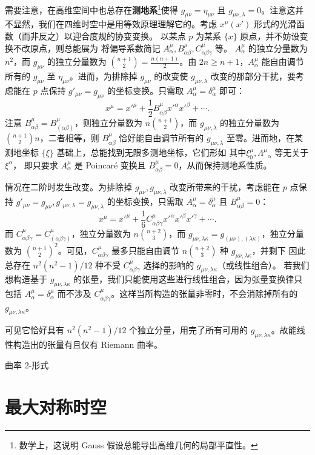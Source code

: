 需要注意，在高维空间中也总存在\textbf{测地系}\footnote{数学上，这说明 Gauss 假设总能导出高维几何的局部平直性。}使得 $g_{\mu\nu}=\eta_{\mu\nu}$ 且 $g_{\mu\nu,\lambda}=0$。注意这并不显然，我们在四维时空中是用等效原理理解它的。考虑 $x^\mu(x')$ 形式的光滑函数（而非反之）以迎合度规的协变变换。
以某点 $p$ 为某系 $\{x\}$ 原点，并不妨设变换不改原点，则总能展为
将偏导系数简记 $A^\mu_\alpha,B^\mu_{\alpha\beta},C^\mu_{\alpha\beta\gamma}$ 等。
$A^\mu_\alpha$ 的独立分量数为 $n^2$，而 $g_{\mu\nu}$ 的独立分量数为 $\binom {n+1}{2}=\frac{n(n+1)}{2}$。由 $2n\geqslant n+1$，$A^\mu_\alpha$ 能自由调节所有的 $g_{\mu\nu}$ 至 $\eta_{\mu\nu}$。进而，为排除掉 $g_{\mu\nu}$ 的改变使 $g_{\mu\nu,\lambda}$ 改变的那部分干扰，要考虑能在 $p$ 点保持 $g'_{\mu\nu}= g_{\mu\nu}$ 的坐标变换。只需取 $A^\mu_\alpha=\delta^\mu_\alpha$ 即可：
\[x^\mu=x'^\mu+\frac 12 B^\mu_{\alpha\beta} x'^\alpha x'^\beta +\cdots.\]
注意 $B^\mu_{\alpha\beta}=B^\mu_{(\alpha\beta)}$，则独立分量数为 $n\binom {n+1}{2}$，而 $g_{\mu\nu,\lambda}$ 的独立分量数为 $\binom {n+1}{2}n$，二者相等，则 $B^\mu_{\alpha\beta}$ 恰好能自由调节所有的 $g_{\mu\nu,\lambda}$ 至零。进而地，在某测地坐标 $\{\xi\}$ 基础上，总能找到无限多测地坐标，它们形如
其中$\xi^\mu_0,\Lambda^\mu{}_\alpha$ 等无关于 $\xi^\alpha$，
即只要求 $A^\mu_\alpha$ 是 Poincaré 变换且 $B^\mu_{\alpha\beta}=0$，从而保持测地系性质。

情况在二阶时发生改变。为排除掉 $g_{\mu\nu},g_{\mu\nu,\lambda}$ 改变所带来的干扰，考虑能在 $p$ 点保持 $g'_{\mu\nu}= g_{\mu\nu}, g'_{\mu\nu,\lambda}=g_{\mu\nu,\lambda}$ 的坐标变换，只需取 $A^\mu_\alpha=\delta^\mu_\alpha$ 且 $B^\mu_{\alpha\beta}=0$：
\[x^\mu=x'^\mu + \frac 16 C^\mu_{\alpha\beta\gamma} x'^\alpha x'^\beta x'^\gamma+\cdots.\]
而 $C^\mu_{\alpha\beta\gamma}=C^\mu_{(\alpha\beta\gamma)}$，独立分量数为 $n\binom {n+2}{3}$，而 $g_{\mu\nu,\lambda\kappa}=g_{(\mu\nu),(\lambda\kappa)}$，独立分量数为 ${\binom {n+1}{2}}^2$。可见，$C^\mu_{\alpha\beta\gamma}$ 最多只能自由调节 $n\binom {n+2}{3}$ 种 $g_{\mu\nu,\lambda\kappa}$，并剩下
因此总存在 ${n^2(n^2-1)}/{12}$ 种不受 $C^\mu_{\alpha\beta\gamma}$ 选择的影响的 $g_{\mu\nu,\lambda\kappa}$（或线性组合）。
若我们想构造基于 $g_{\mu\nu,\lambda\kappa}$ 的张量，我们只能使用这些进行线性组合，因为张量变换律只包括 $A^\mu_\alpha=\delta^\mu_\alpha$ 而不涉及 $C^\mu_{\alpha\beta\gamma}$。这样当所构造的张量非零时，不会消除掉所有的 $g_{\mu\nu,\lambda\kappa}$。


 可见它恰好具有 ${n^2(n^2-1)}/{12}$ 个独立分量，用完了所有可用的 $g_{\mu\nu,\lambda\kappa}$。故能线性构造出的张量有且仅有 Riemann 曲率。


曲率 2-形式

\section{最大对称时空}
